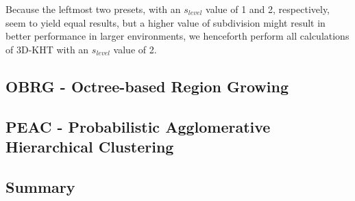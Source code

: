 \documentclass[main.tex]{subfiles}
\begin{document}
Because the leftmost two presets, with an $s_{level}$ value of 1 and 2, respectively, seem to yield equal results, but a higher value of subdivision
might result in better performance in larger environments, we henceforth perform all calculations of 3D-KHT with an $s_{level}$ value of 2.

\subsection*{OBRG - Octree-based Region Growing}
\subsection*{PEAC - Probabilistic Agglomerative Hierarchical Clustering}

\subsection*{Summary}
\end{document}
